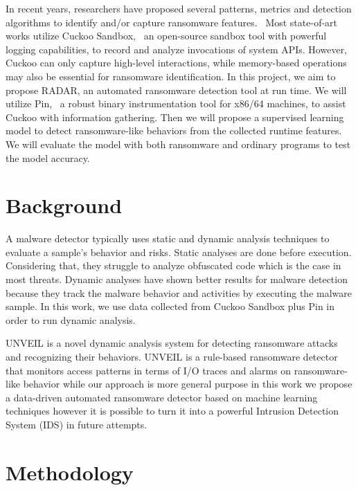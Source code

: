\documentclass[letterpaper,twocolumn,10pt]{article}
\newcommand{\work}{\mbox{\textsc{RADAR}}\xspace}
\begin{document}
In recent years, researchers have proposed several patterns, metrics and detection algorithms to identify and/or capture ransomware features.~\cite{Chen2019AutomatedRB, 8051108, Morat2018RansomwareED, Verma2018DefiningAM}
Most state-of-art works utilize Cuckoo Sandbox,~\cite{CuckooSS} an open-source sandbox tool with powerful logging capabilities, to record and analyze invocations of system APIs.
However, Cuckoo can only capture high-level interactions, while memory-based operations may also be essential for ransomware identification.
In this project, we aim to propose \work, an automated ransomware detection tool at run time.
We will utilize Pin,~\cite{pin} a robust binary instrumentation tool for x86/64 machines, to assist Cuckoo with information gathering.
Then we will propose a supervised learning model to detect ransomware-like behaviors from the collected runtime features.
We will evaluate the model with both ransomware and ordinary programs to test the model accuracy.

\section{Background}

A malware detector typically uses static and dynamic analysis techniques to evaluate a sample's behavior and risks. Static analyses are done before execution. Considering that, they struggle to analyze obfuscated code which is the case in most threats. Dynamic analyses have shown better results for malware detection because they track the malware behavior and activities by executing the malware sample. In this work, we use data collected from Cuckoo Sandbox plus Pin in order to run dynamic analysis. 

UNVEIL \cite{197235} is a novel dynamic analysis system for detecting ransomware attacks and recognizing their behaviors. UNVEIL is a rule-based ransomware detector that monitors access patterns in terms of I/O traces and alarms on ransomware-like behavior while our approach is more general purpose in this work we propose a data-driven automated ransomware detector based on machine learning techniques however it is possible to turn it into a powerful Intrusion Detection System (IDS) in future attempts.

\section{Methodology}
\end{document}
